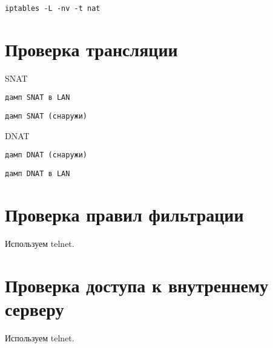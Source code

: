 \documentclass[a4paper,12pt]{article}
\begin{document}
\begin{Verbatim}
iptables -L -nv -t nat
\end{Verbatim}

\section{Проверка трансляции}

SNAT

\begin{Verbatim}
дамп SNAT в LAN
\end{Verbatim}

\begin{Verbatim}
дамп SNAT (снаружи)
\end{Verbatim}

DNAT

\begin{Verbatim}
дамп DNAT (снаружи)
\end{Verbatim}

\begin{Verbatim}
дамп DNAT в LAN
\end{Verbatim}


\section{Проверка правил фильтрации}

Используем telnet.

\section{Проверка доступа к внутреннему серверу}

Используем telnet.
\end{document}
